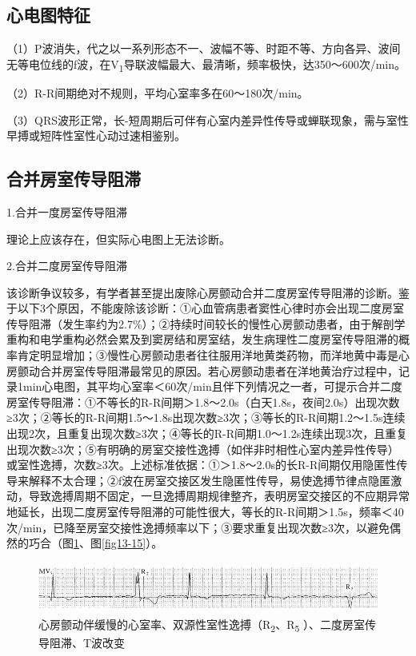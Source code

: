\protect\hypertarget{text00020.htmlux5cux23subid203}{}{}

\subsection{心电图特征}

（1）P波消失，代之以一系列形态不一、波幅不等、时距不等、方向各异、波间无等电位线的f波，在V\textsubscript{1}导联波幅最大、最清晰，频率极快，达350～600次/min。

（2）R-R间期绝对不规则，平均心室率多在60～180次/min。

（3）QRS波形正常，长-短周期后可伴有心室内差异性传导或蝉联现象，需与室性早搏或短阵性室性心动过速相鉴别。

\protect\hypertarget{text00020.htmlux5cux23subid204}{}{}

\subsection{合并房室传导阻滞}

1.合并一度房室传导阻滞

理论上应该存在，但实际心电图上无法诊断。

2.合并二度房室传导阻滞

该诊断争议较多，有学者甚至提出废除心房颤动合并二度房室传导阻滞的诊断。鉴于以下3个原因，不能废除该诊断：①心血管病患者窦性心律时亦会出现二度房室传导阻滞（发生率约为2.7\%）；②持续时间较长的慢性心房颤动患者，由于解剖学重构和电学重构必然会累及到窦房结和房室结，发生病理性二度房室传导阻滞的概率肯定明显增加；③慢性心房颤动患者往往服用洋地黄类药物，而洋地黄中毒是心房颤动合并房室传导阻滞最常见的原因。若心房颤动患者在洋地黄治疗过程中，记录1min心电图，其平均心室率＜60次/min且伴下列情况之一者，可提示合并二度房室传导阻滞：①不等长的R-R间期＞1.8～2.0s（白天1.8s，夜间2.0s）出现次数≥3次；②等长的R-R间期1.5～1.8s出现次数≥3次；③等长的R-R间期1.2～1.5s连续出现2次，且重复出现次数≥3次；④等长的R-R间期1.0～1.2s连续出现3次，且重复出现次数≥3次；⑤有明确的房室交接性逸搏（如伴非时相性心室内差异性传导）或室性逸搏，次数≥3次。上述标准依据：①＞1.8～2.0s的长R-R间期仅用隐匿性传导来解释不太合理；②f波在房室交接区发生隐匿性传导，易使逸搏节律点隐匿激动，导致逸搏周期不固定，一旦逸搏周期规律整齐，表明房室交接区的不应期异常地延长，出现二度房室传导阻滞的可能性很大，等长的R-R间期＞1.5s，频率＜40次/min，已降至房室交接性逸搏频率以下；③要求重复出现次数≥3次，以避免偶然的巧合（图\ref{fig13-14}、图\ref{fig13-15}）。

\begin{figure}[!htbp]
 \centering
 \includegraphics[width=5.58333in,height=0.66667in]{./images/Image00222.jpg}
 \captionsetup{justification=centering}
 \caption{心房颤动伴缓慢的心室率、双源性室性逸搏（R\textsubscript{2}、R\textsubscript{5} ）、二度房室传导阻滞、T波改变}
 \label{fig13-14}
  \end{figure} 


